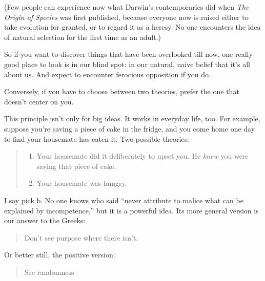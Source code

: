 (Few people can experience now what Darwin's contemporaries did when
\emph{The Origin of Species} was first published, because everyone now
is raised either to take evolution for granted, or to regard it as a
heresy. No one encounters the idea of natural selection for the first
time as an adult.)

So if you want to discover things that have been overlooked till now,
one really good place to look is in our blind spot: in our natural,
naive belief that it's all about us. And expect to encounter ferocious
opposition if you do.

Conversely, if you have to choose between two theories, prefer the one
that doesn't center on you.

This principle isn't only for big ideas. It works in everyday life, too.
For example, suppose you're saving a piece of cake in the fridge, and
you come home one day to find your housemate has eaten it. Two possible
theories:

\begin{quote}
\begin{enumerate}
\def\labelenumi{\alph{enumi})}
\item
  Your housemate did it deliberately to upset you. He \emph{knew} you
  were saving that piece of cake.
\item
  Your housemate was hungry.
\end{enumerate}
\end{quote}

I say pick b. No one knows who said ``never attribute to malice what can
be explained by incompetence,'' but it is a powerful idea. Its more
general version is our answer to the Greeks:

\begin{quote}
Don't see purpose where there isn't.
\end{quote}

Or better still, the positive version:

\begin{quote}
See randomness.
\end{quote}